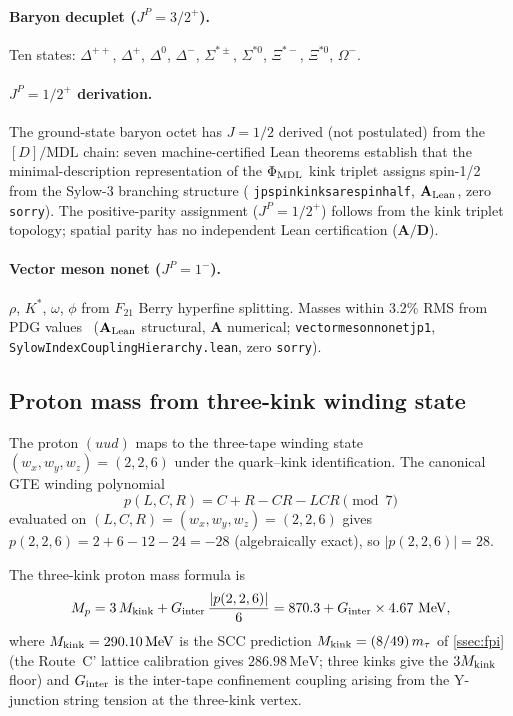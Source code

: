 \documentclass[11pt]{article}
\theoremstyle{remark}
\newcommand{\MDL}{\text{MDL}}
\newcommand{\phimdl}{\Phi_{\rm MDL}}
\newcommand{\Ftwentyone}{F_{21}}
\newcommand{\lean}[1]{%
  \penalty-100
  \begingroup\def\_{\textunderscore\allowbreak}\texttt{#1}\endgroup}
\newcommand{\CatA}{\textbf{A}}
\newcommand{\CatAL}{\ensuremath{\textbf{A}_{\rm Lean}}}
\newcommand{\CatAD}{\textbf{A/D}}
\begin{document}
\paragraph{Baryon decuplet ($J^P = 3/2^+$).}
Ten states: $\Delta^{++}$, $\Delta^+$, $\Delta^0$, $\Delta^-$, $\Sigma^{*\pm}$,
$\Sigma^{*0}$, $\Xi^{*-}$, $\Xi^{*0}$, $\Omega^-$.

\paragraph{$J^P = 1/2^+$ derivation.}
The ground-state baryon octet has $J = 1/2$ derived (not postulated) from
the $[D]/\MDL$ chain: seven machine-certified Lean theorems establish that the
minimal-description representation of the $\phimdl$ kink triplet assigns spin-1/2
from the Sylow-3 branching structure
(\lean{jpspin\_kinks\_are\_spin\_half}, \CatAL{}, zero \texttt{sorry}).
The positive-parity assignment ($J^P = 1/2^+$) follows from the kink triplet
topology; spatial parity has no independent Lean certification ($\CatAD$).

\paragraph{Vector meson nonet ($J^P = 1^-$).}
$\rho$, $K^*$, $\omega$, $\phi$ from $\Ftwentyone$ Berry hyperfine splitting.
Masses within 3.2\% RMS from PDG values~\cite{PDG2022}
($\CatAL{}$ structural, $\CatA{}$ numerical;
\lean{vector\_meson\_nonet\_jp1}, \lean{SylowIndexCouplingHierarchy.lean},
zero \texttt{sorry}).

\subsection{Proton mass from three-kink winding state}
\label{ssec:protonmass}

The proton $(uud)$ maps to the three-tape winding state
$(w_x, w_y, w_z) = (2, 2, 6)$ under the quark--kink identification.
The canonical GTE winding polynomial~\cite{SpivackGTEPolynomialUFT}
\begin{equation}
  p(L, C, R) = C + R - CR - LCR \pmod 7
\end{equation}
evaluated on $(L,C,R) = (w_x, w_y, w_z) = (2,2,6)$ gives
$p(2,2,6) = 2 + 6 - 12 - 24 = -28$ (algebraically exact), so
$|p(2,2,6)| = 28$.

The three-kink proton mass formula is
\begin{equation}
  M_p = 3\,M_{\rm kink} + G_{\rm inter}\,\frac{|p(2,2,6)|}{6}
      = 870.3 + G_{\rm inter} \times 4.67\ \mathrm{MeV},
  \label{eq:proton_mass}
\end{equation}
where $M_{\rm kink} = 290.10\,\mathrm{MeV}$ is the SCC prediction
$M_{\rm kink} = (8/49)\,m_\tau$ of \cref{ssec:fpi} (the Route~C' lattice
calibration gives $286.98\,\mathrm{MeV}$; three kinks give the
$3 M_{\rm kink}$ floor) and $G_{\rm inter}$ is
the inter-tape confinement coupling arising from the Y-junction string
tension at the three-kink vertex.
\end{document}
